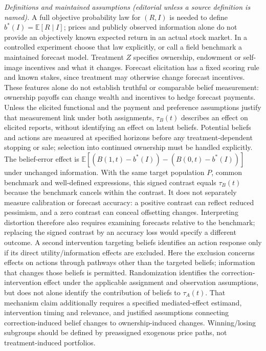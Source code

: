 \documentclass[11pt,a4paper]{article}
\begin{document}
\emph{Definitions and maintained assumptions (editorial unless a source definition is named).} A full objective probability law for \((R,I)\) is needed to define \(b^*(I)=\mathbb E[R\mid I]\); prices and publicly observed information alone do not provide an objectively known expected return in an actual stock market. In a controlled experiment choose that law explicitly, or call a field benchmark a maintained forecast model. Treatment \(Z\) specifies ownership, endowment or self-image incentives and what it changes. Forecast elicitation has a fixed scoring rule and known stakes, since treatment may otherwise change forecast incentives. These features alone do not establish truthful or comparable belief measurement: ownership payoffs can change wealth and incentives to hedge forecast payments. Unless the elicited functional and the payment and preference assumptions justify that measurement link under both assignments, \(\tau_B(t)\) describes an effect on elicited reports, without identifying an effect on latent beliefs. Potential beliefs and actions are measured at specified horizons before any treatment-dependent stopping or sale; selection into continued ownership must be handled explicitly. The belief-error effect is \(\mathbb E[(B(1,t)-b^*(I))-(B(0,t)-b^*(I))]\) under unchanged information. With the same target population \(P\), common benchmark and well-defined expressions, this signed contrast equals \(\tau_B(t)\) because the benchmark cancels within the contrast. It does not separately measure calibration or forecast accuracy: a positive contrast can reflect reduced pessimism, and a zero contrast can conceal offsetting changes. Interpreting distortion therefore also requires examining forecasts relative to the benchmark; replacing the signed contrast by an accuracy loss would specify a different outcome. A second intervention targeting beliefs identifies an action response only if its direct utility/information effects are excluded. Here the exclusion concerns effects on actions through pathways other than the targeted beliefs; information that changes those beliefs is permitted. Randomization identifies the correction-intervention effect under the applicable assignment and observation assumptions, but does not alone identify the contribution of beliefs to \(\tau_A(t)\). That mechanism claim additionally requires a specified mediated-effect estimand, intervention timing and relevance, and justified assumptions connecting correction-induced belief changes to ownership-induced changes. Winning/losing subgroups should be defined by preassigned exogenous price paths, not treatment-induced portfolios.
\end{document}
